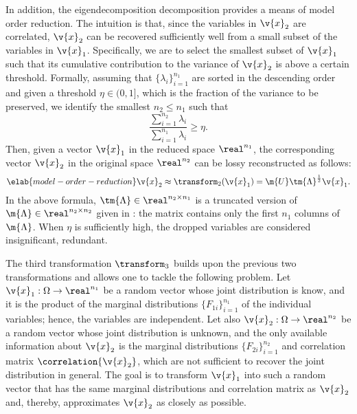 In addition, the eigendecomposition decomposition provides a means of model
order reduction. The intuition is that, since the variables in $\v{x}_2$ are
correlated, $\v{x}_2$ can be recovered sufficiently well from a small subset of
the variables in $\v{x}_1$. Specifically, we are to select the smallest subset
of $\v{x}_1$ such that its cumulative contribution to the variance of $\v{x}_2$
is above a certain threshold. Formally, assuming that $\{ \lambda_i \}_{i =
1}^{n_1}$ are sorted in the descending order and given a threshold $\eta \in (0,
1]$, which is the fraction of the variance to be preserved, we identify the
smallest $n_2 \leq n_1$ such that
\[
  \frac{\sum_{i = 1}^{n_2} \lambda_i}{\sum_{i = 1}^{n_1} \lambda_i} \geq \eta.
\]
Then, given a vector $\v{x}_1$ in the reduced space $\real^{n_1}$, the
corresponding vector $\v{x}_2$ in the original space $\real^{n_2}$ can be lossy
reconstructed as follows:
\begin{equation} \elab{model-order-reduction}
  \v{x}_2 \approx \transform_2(\v{x}_1) = \m{U} \tm{\Lambda}^\frac{1}{2} \v{x}_1.
\end{equation}
In the above formula, $\tm{\Lambda} \in \real^{n_2 \times n_1}$ is a truncated
version of $\m{\Lambda} \in \real^{n_2 \times n_2}$ given in
: the matrix contains only the first $n_1$ columns of
$\m{\Lambda}$. When $\eta$ is sufficiently high, the dropped variables are
considered insignificant, redundant.

The third transformation $\transform_3$ builds upon the previous two
transformations and allows one to tackle the following problem. Let $\v{x}_1:
\Omega \to \real^{n_1}$ be a random vector whose joint distribution is know, and
it is the product of the marginal distributions $\{ F_{1i} \}_{i = 1}^{n_1}$ of
the individual variables; hence, the variables are independent. Let also
$\v{x}_2: \Omega \to \real^{n_2}$ be a random vector whose joint distribution is
unknown, and the only available information about $\v{x}_2$ is the marginal
distributions $\{ F_{2i} \}_{i = 1}^{n_2}$ and correlation matrix
$\correlation{\v{x}_2}$, which are not sufficient to recover the joint
distribution in general. The goal is to transform $\v{x}_1$ into such a random
vector that has the same marginal distributions and correlation matrix as
$\v{x}_2$ and, thereby, approximates $\v{x}_2$ as closely as possible.

